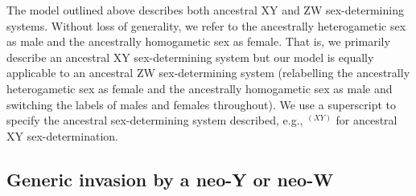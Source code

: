 \documentclass[10pt,letterpaper]{article}
\begin{document}
The model outlined above describes both ancestral XY and ZW sex-determining systems. %
Without loss of generality, we refer to the ancestrally heterogametic sex as male and the ancestrally homogametic sex as female.
That is, we primarily describe an ancestral XY sex-determining system but our model is equally applicable to an ancestral ZW sex-determining system (relabelling the ancestrally heterogametic sex as female and the ancestrally homogametic sex as male and switching the labels of males and females throughout). 
We use a superscript to specify the ancestral sex-determining system described, e.g., $^{(XY)}$ for ancestral XY sex-determination.

\subsection*{Generic invasion by a neo-Y or neo-W}
\end{document}
